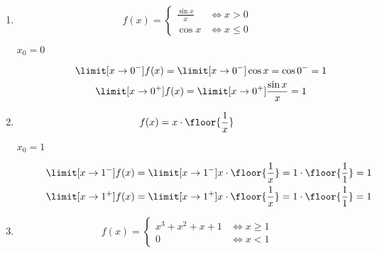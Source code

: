 \begin{enumerate}[label={\alph*)}]
\begin{description}
        \end{description}
    \item
        \begin{equation*}
            f(x) = \begin{cases}
                \frac{\sin x}{x} & \iff x > 0\\
                \cos x & \iff x \leq 0
            \end{cases}
        \end{equation*}
        \begin{description}
            \item[\(x_0 = 0\)]
                \begin{gather*}
                    \limit[x \to 0^-] f(x)
                        = \limit[x \to 0^-] \cos{x}
                        = \cos 0^-
                        = 1\\
                    \limit[x \to 0^+] f(x)
                        = \limit[x \to 0^+] \frac{\sin x}{x}
                        = 1
                \end{gather*}
        \end{description}
    \item
        \begin{equation*}
            f(x) = x \cdot \floor{\frac{1}{x}}
        \end{equation*}
        \begin{description}
            \item[\(x_0 = 1\)]
                \begin{gather*}
                    \limit[x \to 1^-] f(x)
                        = \limit[x \to 1^-] x \cdot \floor{\frac{1}{x}}
                        = 1 \cdot \floor{\frac{1}{1}}
                        = 1\\
                    \limit[x \to 1^+] f(x)
                        = \limit[x \to 1^+] x \cdot \floor{\frac{1}{x}}
                        = 1 \cdot \floor{\frac{1}{1}}
                        = 1
                \end{gather*}
        \end{description}
    \item
        \begin{equation*}
            f(x) = \begin{cases}
                x^3 + x^2 + x + 1 & \iff x \geq 1\\
                0 & \iff x < 1
            \end{cases}
        \end{equation*}

\end{enumerate}
